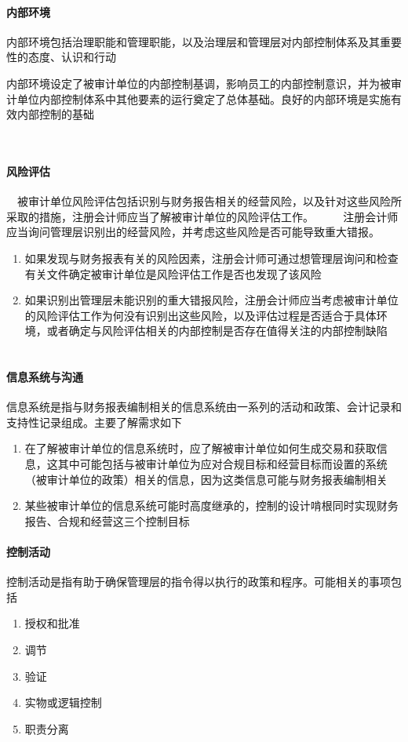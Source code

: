 \documentclass[UTF8,12pt]{ctexart}
\numberwithin{equation}{section} %
\numberwithin{figure}{section}
\numberwithin{table}{section}
\begin{document}
	\paragraph{内部环境}
	内部环境包括治理职能和管理职能，以及治理层和管理层对内部控制体系及其重要性的态度、认识和行动
	
	内部环境设定了被审计单位的内部控制基调，影响员工的内部控制意识，并为被审计单位内部控制体系中其他要素的运行奠定了总体基础。良好的内部环境是实施有效内部控制的基础
	
	　\paragraph{风险评估}
	　被审计单位风险评估包括识别与财务报告相关的经营风险，以及针对这些风险所采取的措施，注册会计师应当了解被审计单位的风险评估工作。
	　
	　注册会计师应当询问管理层识别出的经营风险，并考虑这些风险是否可能导致重大错报。
	
	\begin{enumerate}
		\item 如果发现与财务报表有关的风险因素，注册会计师可通过想管理层询问和检查有关文件确定被审计单位是风险评估工作是否也发现了该风险
	　	
	　	\item 如果识别出管理层未能识别的重大错报风险，注册会计师应当考虑被审计单位的风险评估工作为何没有识别出这些风险，以及评估过程是否适合于具体环境，或者确定与风险评估相关的内部控制是否存在值得关注的内部控制缺陷
	　	
	\end{enumerate}
	
	\paragraph{信息系统与沟通}
	信息系统是指与财务报表编制相关的信息系统由一系列的活动和政策、会计记录和支持性记录组成。主要了解需求如下
	\begin{enumerate}
		\item 在了解被审计单位的信息系统时，应了解被审计单位如何生成交易和获取信息，这其中可能包括与被审计单位为应对合规目标和经营目标而设置的系统（被审计单位的政策）相关的信息，因为这类信息可能与财务报表编制相关
		
		\item 某些被审计单位的信息系统可能时高度继承的，控制的设计啃根同时实现财务报告、合规和经营这三个控制目标
	\end{enumerate}
	
	\paragraph{控制活动}
	控制活动是指有助于确保管理层的指令得以执行的政策和程序。可能相关的事项包括
	\begin{enumerate}
		\item 授权和批准
		
		\item 调节
		
		\item 验证
		
		\item 实物或逻辑控制
		
		\item 职责分离
	\end{enumerate}
	
\end{document}
